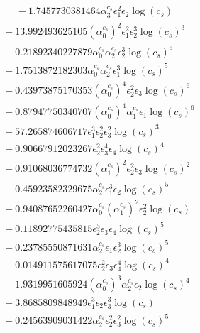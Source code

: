 \documentclass[10pt]{article}
\begin{document}
\begin{align*}
\phantom{F_{s,7}} &\phantom{={}}{}  - 1.7457730381464 \alpha_{3}^{c_s} \epsilon_{1}^{2} \epsilon_{2} \log{\left(c_{s} \right)} \\
&{}  - 13.992493625105 \left(\alpha_{0}^{c_s}\right)^{2} \epsilon_{1}^{2} \epsilon_{2}^{3} \log{\left(c_{s} \right)}^{3} \\
&{}  - 0.21892340227879 \alpha_{0}^{c_s} \alpha_{2}^{c_s} \epsilon_{2}^{3} \log{\left(c_{s} \right)}^{5} \\
&{}  - 1.7513872182303 \alpha_{0}^{c_s} \alpha_{2}^{c_s} \epsilon_{1}^{3} \log{\left(c_{s} \right)}^{5} \\
&{}  - 0.43973875170353 \left(\alpha_{0}^{c_s}\right)^{4} \epsilon_{2}^{2} \epsilon_{3} \log{\left(c_{s} \right)}^{6} \\
&{}  - 0.87947750340707 \left(\alpha_{0}^{c_s}\right)^{4} \alpha_{1}^{c_s} \epsilon_{1} \log{\left(c_{s} \right)}^{6} \\
&{}  - 57.265874606717 \epsilon_{1}^{3} \epsilon_{2}^{2} \epsilon_{3}^{2} \log{\left(c_{s} \right)}^{3} \\
&{}  - 0.90667912023267 \epsilon_{2}^{2} \epsilon_{3}^{4} \epsilon_{4} \log{\left(c_{s} \right)}^{4} \\
&{}  - 0.91068036774732 \left(\alpha_{1}^{c_s}\right)^{2} \epsilon_{2}^{2} \epsilon_{3} \log{\left(c_{s} \right)}^{2} \\
&{}  - 0.45923582329675 \alpha_{2}^{c_s} \epsilon_{1}^{3} \epsilon_{2} \log{\left(c_{s} \right)}^{5} \\
&{}  - 0.94087652260427 \alpha_{0}^{c_s} \left(\alpha_{1}^{c_s}\right)^{2} \epsilon_{2}^{2} \log{\left(c_{s} \right)} \\
&{}  - 0.11892775435815 \epsilon_{2}^{5} \epsilon_{3} \epsilon_{4} \log{\left(c_{s} \right)}^{5} \\
&{}  - 0.23785550871631 \alpha_{2}^{c_s} \epsilon_{1} \epsilon_{2}^{3} \log{\left(c_{s} \right)}^{5} \\
&{}  - 0.014911575617075 \epsilon_{2}^{2} \epsilon_{3} \epsilon_{4}^{4} \log{\left(c_{s} \right)}^{4} \\
&{}  - 1.9319951605924 \left(\alpha_{0}^{c_s}\right)^{3} \alpha_{2}^{c_s} \epsilon_{2} \log{\left(c_{s} \right)}^{4} \\
&{}  - 3.8685809848949 \epsilon_{1}^{3} \epsilon_{2} \epsilon_{3}^{3} \log{\left(c_{s} \right)} \\
&{}  - 0.24563909031422 \alpha_{2}^{c_s} \epsilon_{2}^{2} \epsilon_{3}^{2} \log{\left(c_{s} \right)}^{5} \\

\end{align*}
\end{document}

